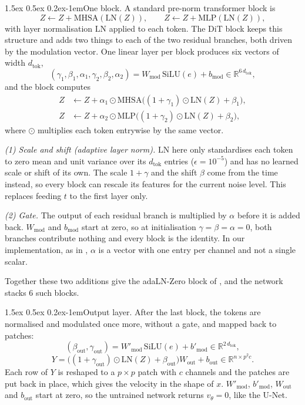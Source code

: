 \documentclass{article}
\makeatletter
\renewcommand{\normalsize}{\fontsize{10pt}{11pt}\selectfont}
\renewcommand{\paragraph}{\@startsection{paragraph}{4}{\z@}%
  {1.5ex \@plus 0.5ex \@minus 0.2ex}{-1em}{\normalsize\bfseries}}
\theoremstyle{remark}
\newcommand{\R}{\mathbb{R}}
\makeatother
\begin{document}
\paragraph{One block.} A standard pre-norm transformer block is
$$
  Z \leftarrow Z + \mathrm{MHSA}(\mathrm{LN}(Z)),\qquad Z \leftarrow Z + \mathrm{MLP}(\mathrm{LN}(Z)),
$$
with layer normalisation $\mathrm{LN}$ \citep{ba2016layernorm} applied to each token. The DiT block keeps this structure and adds two things to each of the two residual branches, both driven by the modulation vector. One linear layer per block produces six vectors of width $d_{\mathrm{tok}}$,
$$
  (\gamma_1,\beta_1,\alpha_1,\gamma_2,\beta_2,\alpha_2) = W_{\mathrm{mod}}\,\mathrm{SiLU}(e) + b_{\mathrm{mod}} \in \R^{6\,d_{\mathrm{tok}}},
$$
and the block computes
\begin{align*}
  Z&\leftarrow Z + \alpha_1 \odot \mathrm{MHSA}\big((1 + \gamma_1) \odot \mathrm{LN}(Z) + \beta_1\big),\\
  Z&\leftarrow Z + \alpha_2 \odot \mathrm{MLP}\big((1 + \gamma_2) \odot \mathrm{LN}(Z) + \beta_2\big),
\end{align*}
where $\odot$ multiplies each token entrywise by the same vector.

\emph{(1) Scale and shift (adaptive layer norm).} $\mathrm{LN}$ here only standardises each token to zero mean and unit variance over its $d_{\mathrm{tok}}$ entries ($\epsilon = 10^{-5}$) and has no learned scale or shift of its own. The scale $1 + \gamma$ and the shift $\beta$ come from the time instead, so every block can rescale its features for the current noise level. This replaces feeding $t$ to the first layer only.

\emph{(2) Gate.} The output of each residual branch is multiplied by $\alpha$ before it is added back. $W_{\mathrm{mod}}$ and $b_{\mathrm{mod}}$ start at zero, so at initialisation $\gamma = \beta = \alpha = 0$, both branches contribute nothing and every block is the identity. In our implementation, as in \citet{peebles2023dit}, $\alpha$ is a vector with one entry per channel and not a single scalar.

Together these two additions give the adaLN-Zero block of \citet{peebles2023dit}, and the network stacks $6$ such blocks.

\paragraph{Output layer.} After the last block, the tokens are normalised and modulated once more, without a gate, and mapped back to patches:
$$
  (\beta_{\mathrm{out}},\gamma_{\mathrm{out}}) = W'_{\mathrm{mod}}\,\mathrm{SiLU}(e) + b'_{\mathrm{mod}} \in \R^{2\,d_{\mathrm{tok}}},
$$
$$
  Y = \big((1 + \gamma_{\mathrm{out}}) \odot \mathrm{LN}(Z) + \beta_{\mathrm{out}}\big)W_{\mathrm{out}} + b_{\mathrm{out}} \in \R^{n \times p^2c}.
$$
Each row of $Y$ is reshaped to a $p \times p$ patch with $c$ channels and the patches are put back in place, which gives the velocity in the shape of $x$. $W'_{\mathrm{mod}}$, $b'_{\mathrm{mod}}$, $W_{\mathrm{out}}$ and $b_{\mathrm{out}}$ start at zero, so the untrained network returns $v_\theta = 0$, like the U-Net.
\end{document}
